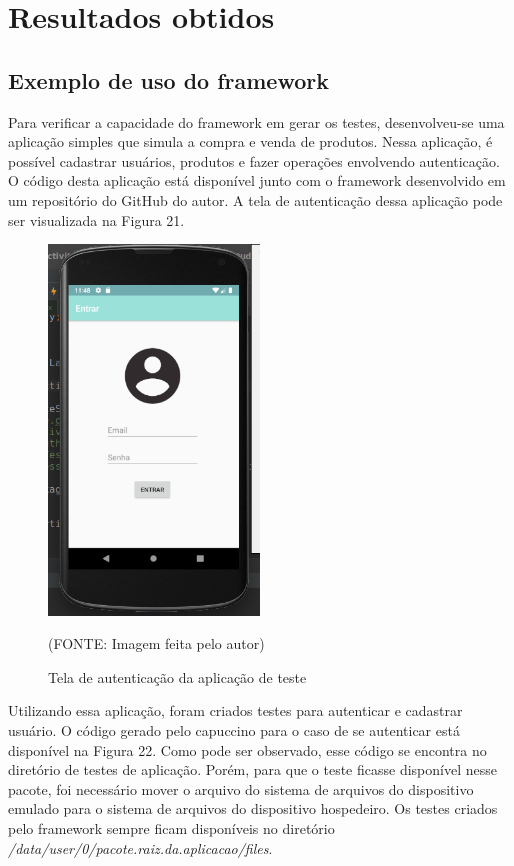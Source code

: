 \documentclass[
    12pt,       %
    openright,      %
    twoside,      %
    a4paper,      %
    english,      %
    french,       %
    spanish,      %
    brazil,       %
    ]{abntex2}
\begin{document}
  \part{Resultados obtidos}
    \chapter{Exemplo de uso do framework}
      Para verificar a capacidade do framework em gerar os testes, desenvolveu-se uma aplicação simples que
      simula a compra e venda de produtos. Nessa aplicação, é possível cadastrar usuários, produtos e fazer
      operações envolvendo autenticação. O código desta aplicação está disponível junto com o framework
      desenvolvido em um repositório do GitHub do autor. A tela de autenticação dessa aplicação pode ser
      visualizada na Figura 21.

      \begin{figure}[htbp]
        \begin{center}
          \includegraphics[width=0.5\textwidth]{img/escamboLogin.png}
            \end{center}
          \caption{\label{fig:passaro} Tela de autenticação da aplicação de teste}
        \begin{center}(FONTE: Imagem feita pelo autor)\end{center}
      \end{figure}

      Utilizando essa aplicação, foram criados testes para autenticar e cadastrar usuário. O código gerado pelo
      capuccino para o caso de se autenticar está disponível na Figura 22. Como pode ser observado, esse código
      se encontra no diretório de testes de aplicação. Porém, para que o teste ficasse disponível nesse pacote,
      foi necessário mover o arquivo do sistema de arquivos do dispositivo emulado para o sistema de arquivos do
      dispositivo hospedeiro. Os testes criados pelo framework sempre ficam disponíveis no diretório
      \textit{/data/user/0/pacote.raiz.da.aplicacao/files}.
\end{document}
